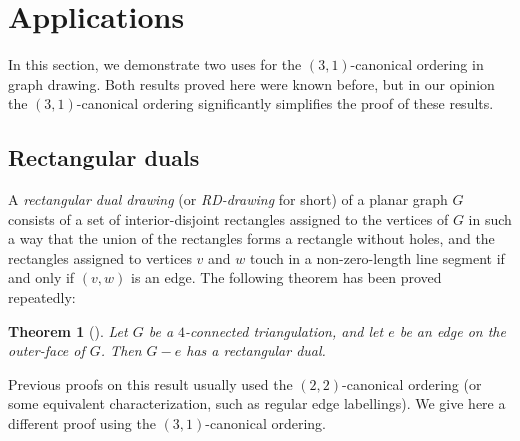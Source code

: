 \documentclass[12pt]{article}
\newtheorem{theorem}{Theorem}
\begin{document}
\section{Applications}
\label{se:appl}


In this section, we demonstrate two uses for the $(3,1)$-canonical
ordering in graph drawing.  Both results proved here were known before,
but in our opinion the $(3,1)$-canonical ordering significantly simplifies
the proof of these results.

\subsection{Rectangular duals}
\label{sec:rd}


A {\em rectangular dual drawing} (or {\em RD-drawing} for short) of a 
planar graph $G$ consists of
a set of interior-disjoint rectangles assigned to the vertices of $G$ 
in such a way that the union of the rectangles forms a rectangle without
holes, and the rectangles assigned to vertices $v$ and $w$ touch in a
non-zero-length line segment if and only if $(v,w)$ is an edge.
The following theorem has been proved repeatedly:

\begin{theorem}[\cite{Ung53,Tho84,KH97}]
Let $G$ be a $4$-connected triangulation, and let $e$
be an edge on the outer-face of $G$.  Then $G-e$ has a rectangular
dual.
\end{theorem}

Previous proofs on this result usually used the $(2,2)$-canonical
ordering (or some equivalent characterization, such as regular
edge labellings).  We give here a different proof using the
$(3,1)$-canonical ordering.
\end{document}
